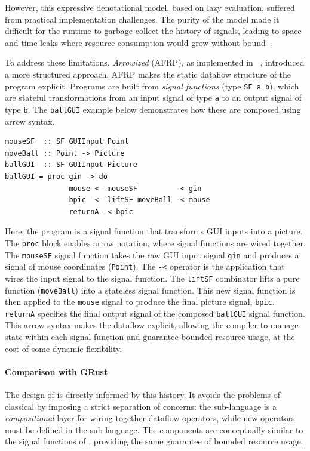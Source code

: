 However, this expressive denotational model, based on lazy evaluation, suffered from practical
implementation challenges. The purity of the model made it difficult for the runtime to garbage
collect the history of signals, leading to space and time leaks where resource consumption would
grow without bound~\cite{DBLP:conf/icfp/Krishnaswami13}.

To address these limitations, \emph{Arrowized \frp} (AFRP), as implemented in
\Yampa~\cite{DBLP:conf/haskell/CourtneyNP03}, introduced a more structured approach. AFRP
makes the static dataflow structure of the program explicit. Programs are built from \emph{signal
  functions} (type \texttt{SF a b}), which are stateful transformations from an input signal of
type \texttt{a} to an output signal of type \texttt{b}. The \texttt{ballGUI} example below
demonstrates how these are composed using arrow syntax.

\newpage

\begin{lstlisting}[basicstyle=\ttfamily\footnotesize\color{BlackText}]
mouseSF  :: SF GUIInput Point
moveBall :: Point -> Picture
ballGUI  :: SF GUIInput Picture
ballGUI = proc gin -> do
               mouse <- mouseSF         -< gin
               bpic  <- liftSF moveBall -< mouse
               returnA -< bpic
\end{lstlisting}

Here, the program is a signal function that transforms GUI inputs into a picture. The \texttt{proc}
block enables arrow notation, where signal functions are wired together. The \texttt{mouseSF} signal
function takes the raw GUI input signal \texttt{gin} and produces a signal of mouse coordinates
(\texttt{Point}). The \texttt{-<} operator is the application that wires the input signal to the
signal function. The \texttt{liftSF} combinator lifts a pure function (\texttt{moveBall}) into a
stateless signal function. This new signal function is then applied to the \texttt{mouse} signal to
produce the final picture signal, \texttt{bpic}. \texttt{returnA} specifies the final output signal
of the composed \texttt{ballGUI} signal function. This arrow syntax makes the dataflow explicit,
allowing the compiler to manage state within each signal function and guarantee bounded resource
usage, at the cost of some dynamic flexibility.

\paragraph*{Comparison with GRust}
The design of \GRust is directly informed by this history. It avoids the problems of classical \frp
by imposing a strict separation of concerns: the \GRFRP sub-language is a \emph{compositional} layer for
wiring together dataflow operators, while new operators must be defined in the \GRSync sub-language. The
\GRSync components are conceptually similar to the signal functions of \Yampa, providing the
same guarantee of bounded resource usage.

